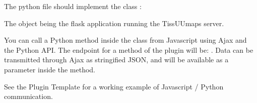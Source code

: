\documentclass[letterpaper,10pt,english,openany,oneside]{sphinxmanual}
\begin{document}
\sphinxAtStartPar
The python file should implement the class :

\begin{sphinxVerbatim}[commandchars=\\\{\}]
  

     
          

     
          
            \PYG{p}{[}\PYG{p}{]}
         

\end{sphinxVerbatim}

\sphinxAtStartPar
The  object being the flask application running the TissUUmaps server.

\sphinxAtStartPar
You can call a Python method inside the  class from Javascript using Ajax and the Python API. The endpoint for a method  of the plugin  will be: . Data can be transmitted through Ajax as stringified JSON, and will be available as a parameter inside the method.

\sphinxAtStartPar
See the Plugin Template for a working example of Javascript / Python communication.

\sphinxstepscope
\end{document}
